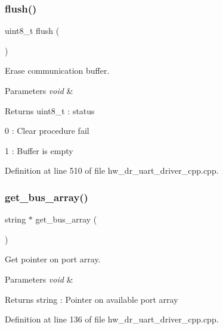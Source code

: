\subsubsection{flush()}
{\footnotesize\ttfamily uint8\+\_\+t flush (\begin{DoxyParamCaption}\item[{void}]{ }\end{DoxyParamCaption})}



Erase communication buffer. 


\begin{DoxyParams}{Parameters}
{\em void} & \\
\hline
\end{DoxyParams}
\begin{DoxyReturn}{Returns}
uint8\+\_\+t \+: status \begin{DoxyItemize}
\item 0 \+: Clear procedure fail \item 1 \+: Buffer is empty \end{DoxyItemize}

\end{DoxyReturn}


Definition at line 510 of file hw\+\_\+dr\+\_\+uart\+\_\+driver\+\_\+cpp.\+cpp.

\mbox{\label{group___u_a_r_t_ga8b5def1ddf2d0145b4cb954e846703b8}} 
\subsubsection{get\_bus\_array()}
{\footnotesize\ttfamily string $\ast$ get\+\_\+bus\+\_\+array (\begin{DoxyParamCaption}\item[{void}]{ }\end{DoxyParamCaption})}



Get pointer on port array. 


\begin{DoxyParams}{Parameters}
{\em void} & \\
\hline
\end{DoxyParams}
\begin{DoxyReturn}{Returns}
string \+: Pointer on available port array 
\end{DoxyReturn}


Definition at line 136 of file hw\+\_\+dr\+\_\+uart\+\_\+driver\+\_\+cpp.\+cpp.

